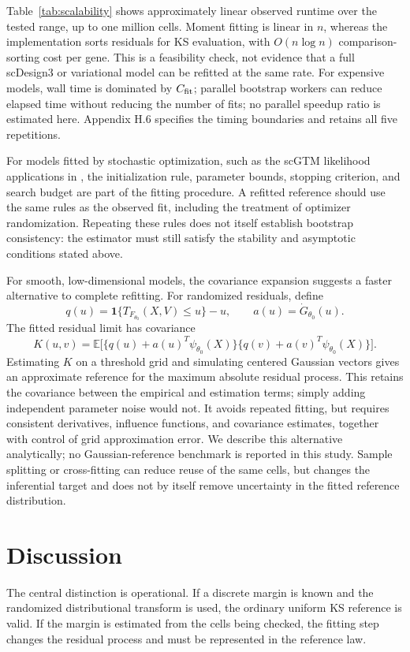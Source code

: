 \documentclass[preprint,12pt]{elsarticle}
\theoremstyle{plain}
\theoremstyle{remark}
\begin{document}
Table~\ref{tab:scalability} shows approximately linear observed runtime over
the tested range, up to one million cells. Moment fitting is linear in $n$,
whereas the implementation sorts residuals for KS evaluation, with
$O(n\log n)$ comparison-sorting cost per gene. This is a feasibility check, not
evidence that a full scDesign3 or variational model can be refitted at the same
rate. For expensive models, wall time is dominated by $C_{\rm fit}$; parallel
bootstrap workers can reduce elapsed time without reducing the number of
fits; no parallel speedup ratio is estimated here. Appendix H.6 specifies
the timing boundaries and retains all five repetitions.

For models fitted by stochastic optimization, such as the scGTM likelihood
applications in \citet{cui2024natureinspired}, the initialization rule,
parameter bounds, stopping criterion, and search budget are part of the
fitting procedure. A refitted reference should use the same rules as the
observed fit, including the treatment of optimizer randomization. Repeating
these rules does not itself establish bootstrap consistency: the estimator
must still satisfy the stability and asymptotic conditions stated above.

For smooth, low-dimensional models, the covariance expansion suggests a
faster alternative to complete refitting. For randomized residuals, define
\[
q(u)=\mathbf 1\{T_{F_{\theta_0}}(X,V)\le u\}-u,
\qquad a(u)=\dot G_{\theta_0}(u).
\]
The fitted residual limit has covariance
\[
K(u,v)=\mathbb E\bigl[\{q(u)+a(u)^T\psi_{\theta_0}(X)\}
\{q(v)+a(v)^T\psi_{\theta_0}(X)\}\bigr].
\]
Estimating $K$ on a threshold grid and simulating centered Gaussian vectors
gives an approximate reference for the maximum absolute residual process.
This retains the covariance between the empirical and estimation terms;
simply adding independent parameter noise would not. It avoids repeated
fitting, but requires consistent derivatives, influence functions, and
covariance estimates, together with control of grid approximation error.
We describe this alternative analytically; no Gaussian-reference benchmark
is reported in this study. Sample splitting or cross-fitting can reduce reuse of the same cells,
but changes the inferential target and does not by itself remove uncertainty in
the fitted reference distribution.

\section{Discussion}
The central distinction is operational. If a discrete margin is known and the
randomized distributional transform is used, the ordinary uniform KS reference
is valid. If the margin is estimated from the cells being checked, the fitting
step changes the residual process and must be represented in the reference
law.
\end{document}
